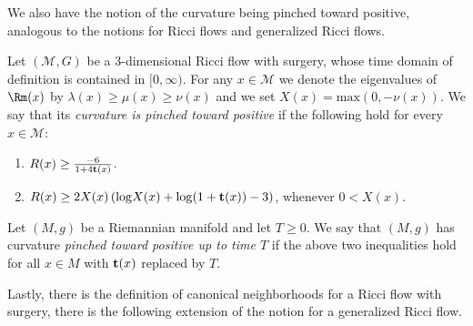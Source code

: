We also have the notion of the curvature being  pinched toward
positive, analogous to the notions for Ricci flows and  generalized Ricci flows.

\begin{definition}
\label{def:curvature-pinched-toward-positive-surgery}
Let $({\mathcal M},G)$ be a $3$-dimensional Ricci flow with surgery,
whose time domain of definition is contained in $[0,\infty)$. For
any $x\in {\mathcal M}$ we denote the eigenvalues of $\Rm(x)$ by
$\lambda(x)\ge \mu(x)\ge \nu(x)$ and we set $X(x)=\mathrm{max}(0,-\nu(x))$.
 We say
that its {\em curvature is pinched toward positive} if the following
hold for every $x\in {\mathcal M}$:
\begin{enumerate}
\item[(1)] $R(x)\ge \frac{-6}{1+4{\bf t}(x)}$.
\item[(2)] $R(x)\geq 2X(x)\left(\mathrm{log}X(x)+\mathrm{log}(1+{\bf t}(x))-3\right)$, whenever $0<X(x)$.
\end{enumerate}

Let $(M,g)$ be a Riemannian manifold and let $T\ge 0$.
We say that $(M,g)$ has curvature {\em pinched toward positive up to time $T$} if
the above two inequalities hold for all $x\in M$ with ${\bf t}(x)$ replaced by $T$.
\end{definition}

Lastly, there is the definition of canonical neighborhoods for a
Ricci flow with surgery, there is the following extension of the
notion for a generalized Ricci flow.


